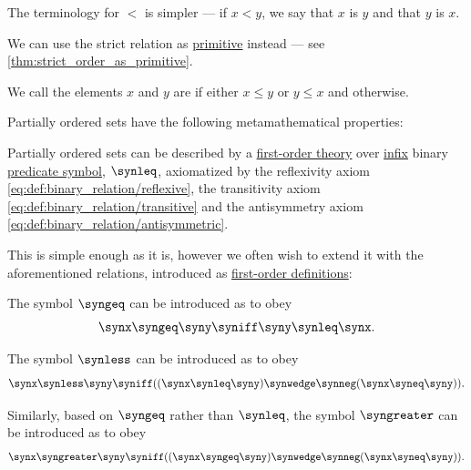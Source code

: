 \begin{definition}
\begin{thmenum}[series=def:partially_ordered_set]
    The terminology for \( < \) is simpler --- if \( x < y \), we say that \( x \) is  \( y \) and that \( y \) is  \( x \).

    We can use the strict relation as \hyperref[con:primitive_notion]{primitive} instead --- see \cref{thm:strict_order_as_primitive}.

     We call the elements \( x \) and \( y \) are  if either \( x \leq y \) or \( y \leq x \) and  otherwise.
  \end{thmenum}

  Partially ordered sets have the following metamathematical properties:
  \begin{thmenum}[resume=def:partially_ordered_set]
    \mimprovised Partially ordered sets can be described by a \hyperref[def:fol_theory]{first-order theory} over \hyperref[def:fol_signature/notation]{infix} binary \hyperref[def:fol_signature/predicate]{predicate symbol}, \( {\synleq} \), axiomatized by the reflexivity axiom \eqref{eq:def:binary_relation/reflexive}, the transitivity axiom \eqref{eq:def:binary_relation/transitive} and the antisymmetry axiom \eqref{eq:def:binary_relation/antisymmetric}.

    This is simple enough as it is, however we often wish to extend it with the aforementioned relations, introduced as \hyperref[def:fol_definition/predicate]{first-order definitions}:
    \begin{thmenum}
       The symbol \( {\syngeq} \) can be introduced as to obey
      \begin{equation}\label{eq:def:partially_ordered_set/theory/geq}
        \synx \syngeq \syny \syniff \syny \synleq \synx.
      \end{equation}

       The symbol \( {\synless} \) can be introduced as to obey
      \begin{equation}\label{eq:def:partially_ordered_set/theory/strict}
        \synx \synless \syny \syniff ((\synx \synleq \syny) \synwedge \synneg (\synx \syneq \syny)).
      \end{equation}

       Similarly, based on \( {\syngeq} \) rather than \( {\synleq} \), the symbol \( {\syngreater} \) can be introduced as to obey
      \begin{equation}\label{eq:def:partially_ordered_set/theory/greater}
        \synx \syngreater \syny \syniff ((\synx \syngeq \syny) \synwedge \synneg (\synx \syneq \syny)).
      \end{equation}
    \end{thmenum}


\end{thmenum}
\end{definition}
